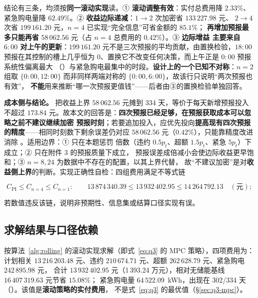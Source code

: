 结论有三条，均须按\textbf{同一滚动实现}读。① \textbf{滚动调整有效}：实付总费用降 \(2.33\%\)、
紧急购电量降 \(62.49\%\)。② \textbf{收益边际递减}：\(1\to2\) 次加密省 \(133\,227.98\) 元、
\(2\to4\) 次省 \(199\,161.20\) 元，\(n=4\) 已实现“完全信息”可省金额的 \(\mathbf{85.1\%}\)；
\textbf{再增加预报最多只能再省} \(58\,062.56\) 元（占 \(n=4\) 总费用的 \(0.42\%\)）。③ \textbf{边际增益
主要来自 \(6{:}00\) 对上午的更新}：\(199\,161.20\) 元不是三次预报的平均贡献，由置换检验，\(18{:}00\)
预报在其控制的槽上几乎恒为 0、置换它不改变任何决策，而上午正是 \(0{:}00\) 预报系统性偏离最大
（）与紧急购电最集中的时段。\textbf{设计上的一个已知不对称}：\(n=2\) 组取
\(\{0{:}00,12{:}00\}\) 而非同样两端对称的 \(\{0{:}00,6{:}00\}\)，故该行只说明“两次预报也有效”，
\textbf{不能}用来推断“哪一次预报更值钱”——后者由③的置换检验单独回答。

\textbf{成本侧与结论。} 把收益上界 \(58\,062.56\) 元摊到 334 天，等价于每天新增预报投入不超过
\(173.84\) 元。故本文的回答是：\textbf{四次预报已经足够，在预报获取成本可以忽略之前不建议继续加密
预报时刻}；若要追加投入，应优先投向\textbf{提高现有四次预报的精度}——相同时刻数下剩余误差仍对应
\(58\,062.56\) 元（\(0.42\%\)），只能靠精度改进消除 。适用边界：① 只在本题惩罚
倍数（违约 \(0.5p_t\)、超额 \(1.5p_t\)、紧急 \(5p_t\)）下成立；② 只在附件 3 的预报质量下成立，
预报误差成倍减小会使边际收益更早饱和；③ \(n=8,24\) 为数据中不存在的配置，以其上界代替，
故“不建议加密”是对\textbf{收益侧上界}的判断。实现正确性自检：四组费用满足不等式链

\begin{equation}
  C_{\mathrm{PI}}\le C_{n=4}\le C_{n=1}:\qquad
  13\,874\,340.39\le13\,932\,402.95\le14\,264\,792.13\quad(\text{元});
  \label{eq:q3-chain}
\end{equation}

若数值违反该链，说明非预期性、信息集或结算口径实现有误。

\subsection{求解结果与口径依赖}

按算法~\ref{alg:rolling} 的滚动实现求解（即式~\eqref{eq:q3} 的 MPC 策略），四项费用为：计划相关
\(13\,216\,203.48\) 元、违约 \(210\,674.71\) 元、超额 \(262\,628.79\) 元、紧急购电 \(242\,895.98\) 元，
合计 \(13\,932\,402.95\) 元（1\,393.24 万元），相对无储能基线 \(16\,407\,319.63\) 元节省 \(15.08\%\)；
紧急购电量 \(64\,522.09\)~kWh，出现在 302/334 天（）。该值是\textbf{滚动策略的实付费用}，
不是式~\eqref{eq:q3} 的最优值（\S\ref{sec:q3-mpc}）。


